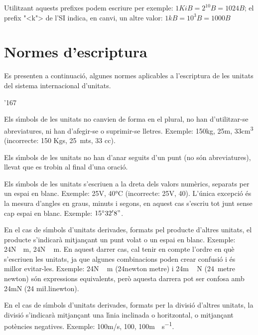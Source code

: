 Utilitzant aquests prefixes podem escriure per exemple: $1\unit{KiB} =2^{10}\unit{B} = 1024\unit{B}$; el prefix {"<}k{">} de l'SI indica, en canvi, un altre valor:  $1\unit{kB} =10^3\unit{B} = 1000\unit{B}$

\section{Normes d'escriptura}

Es presenten a continuaci\'{o}, algunes normes aplicables a l'escriptura
de les unitats del sistema internacional d'unitats.


\begin{dinglist}{'167}
\item Els s\'{\i}mbols de les unitats no canvien de forma en el plural, no han
d'utilitzar-se abreviatures, ni han d'afegir-se o suprimir-se
lletres. Exemple: 150\unit{kg}, 25\unit{m},  33\unit{cm^3}
(incorrecte: 150 Kgs, 25~mts, 33 cc).

\item Els s\'{\i}mbols de les unitats no han d'anar seguits d'un punt (no s\'{o}n
abreviatures), llevat que es trobin al final d'una oraci\'{o}.

\item Els s\'{\i}mbols de les unitats s'escriuen a la dreta dels valors
num\`{e}rics, separats per un espai en blanc. Exemple: 25\unit{V},
40\unit{\celsius} (incorrecte: 25V, 40\celsius). L'\'{u}nica excepci\'{o} \'{e}s la mesura d'angles en graus, minuts i segons, en aquest cas s'escriu tot junt sense cap espai en blanc. Exemple: $15^\circ{}32'8"$.

\item En el cas de s\'{\i}mbols d'unitats derivades, formats pel producte
d'altres unitats, el producte s'indicar\`{a} mitjan\c{c}ant un punt volat o
un espai en blanc. Exemple: 24\unit{N\cdot m}, 24\unit{N\,m}. En
aquest darrer cas, cal tenir en compte  l'ordre en qu\`{e} s'escriuen
les unitats, ja que algunes combinacions poden crear confusi\'{o} i
\'{e}s millor evitar-les. Exemple: 24\unit{N\,m} (24newton metre) i
24\unit{m\,N} (24~metre newton) s\'{o}n expressions equivalents, per\`{o}
aquesta darrera pot ser confosa amb 24\unit{mN} (24 mi{\l.l}inewton).

\item En el cas de s\'{\i}mbols d'unitats derivades, formats per la divisi\'{o}
d'altres unitats, la divisi\'{o} s'indicar\`{a} mitjan\c{c}ant una l\'{\i}nia
inclinada o horitzontal, o mitjan\c{c}ant pot\`{e}ncies negatives. Exemple:
100\unit{m/s}, 100\unit{}, 100\unit{m\cdot s^{-1}}.


\end{dinglist}
